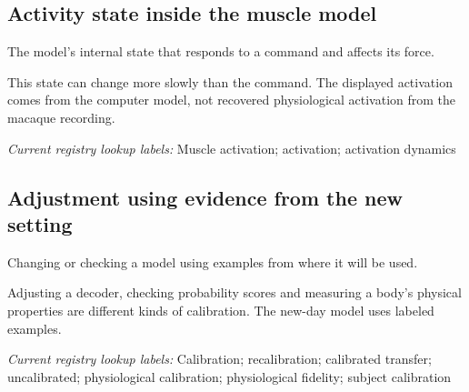 \begin{samepage}
\subsection*{Activity state inside the muscle model}
\noindent The model’s internal state that responds to a command and affects its force.\par
\end{samepage}
\begin{samepage}
\noindent This state can change more slowly than the command. The displayed activation comes from the computer model, not recovered physiological activation from the macaque recording.\par\nopagebreak[4]

\end{samepage}


\noindent\textit{Current registry lookup labels:} Muscle activation; activation; activation dynamics\par

\begin{samepage}
\subsection*{Adjustment using evidence from the new setting}
\noindent Changing or checking a model using examples from where it will be used.\par
\end{samepage}
\begin{samepage}
\noindent Adjusting a decoder, checking probability scores and measuring a body’s physical properties are different kinds of calibration. The new-day model uses labeled examples.\par\nopagebreak[4]

\end{samepage}


\noindent\textit{Current registry lookup labels:} Calibration; recalibration; calibrated transfer; uncalibrated; physiological calibration; physiological fidelity; subject calibration\par

